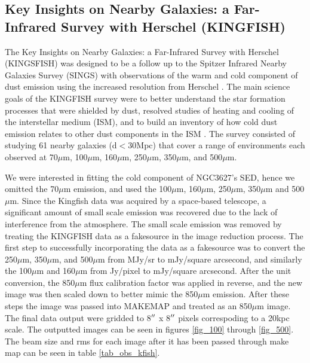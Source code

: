 \subsection{Key Insights on Nearby Galaxies: a Far-Infrared Survey with Herschel (KINGFISH)}


The Key Insights on Nearby Galaxies: a Far-Infrared Survey with Herschel (KINGSFISH) was designed to be a follow up to the Spitzer Infrared Nearby Galaxies Survey (SINGS) \citep{kennicutt2003} with observations of the warm and cold component of dust emission using the increased resolution from Herschel \citep{kennicutt2011}.  The main science goals of the KINGFISH survey were to better understand the star formation processes that were shielded by dust, resolved studies of heating and cooling of the interstellar medium (ISM), and to build an inventory of how cold dust emission relates to other dust components in the ISM \citep{kennicutt2011}.  The survey consisted of studying 61 nearby galaxies (d$<$30Mpc) that cover a range of environments each observed at 70$\mu$m, 100$\mu$m, 160$\mu$m, 250$\mu$m, 350$\mu$m, and 500$\mu$m.  

We were interested in fitting the cold component of NGC3627's SED, hence we omitted the 70$\mu$m emission, and used the 100$\mu$m, 160$\mu$m, 250$\mu$m, 350$\mu$m and 500$\mu$m.  Since the Kingfish data was acquired by a space-based telescope, a significant amount of small scale emission was recovered due to the lack of interference from the atmosphere.  The small scale emission was removed by treating the KINGFISH data as a fakesource in the image reduction process.  The first step to successfully incorporating the data as a fakesource was to convert the 250$\mu$m, 350$\mu$m, and 500$\mu$m from MJy/sr to mJy/square arcsecond, and similarly the 100$\mu$m and 160$\mu$m from Jy/pixel to mJy/square arcsecond.   After the unit conversion, the 850$\mu$m flux calibration factor was applied in reverse, and the new image was then scaled down to better mimic the 850$\mu$m emission.  After these steps the image was passed into MAKEMAP and treated as an 850$\mu$m image.  The final data output were gridded to 8$\mbox{$^{\prime\prime}$}$ x 8$\mbox{$^{\prime\prime}$}$ pixels correspoding to a 20kpc scale.  The outputted images can be seen in figures \ref{fig_100} through \ref{fig_500}.  The beam size and rms for each image after it has been passed through make map can be seen in table \ref{tab_obs_kfish}.

